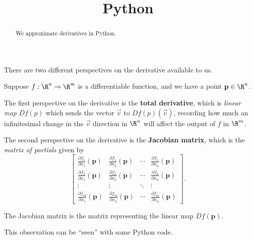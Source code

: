 \documentclass{ximera}
\title{Python}
\begin{document}
\begin{abstract}
  We approximate derivatives in Python.
\end{abstract}

There are two different perspectives on the derivative available to us.

Suppose $f : \R^n \to \R^m$ is a differentiable function, and we have
a point $\mathbf{p} \in \R^n$.

The first perspective on the derivative is the \textbf{total
  derivative}, which is \textit{linear map} $Df(p)$ which sends the
vector $\vec{v}$ to $Df(p)(\vec{v})$, recording how much an
infinitesimal change in the $\vec{v}$ direction in $\R^n$ will affect
the output of $f$ in $\R^m$.

The second perspective on the derivative is the \textbf{Jacobian
  matrix}, which is the \textit{matrix of partials} given by
$$
\begin{bmatrix}
  \frac{\partial f_1}{\partial x_1} \left(\mathbf{p}\right) & \frac{\partial f_1}{\partial x_2} \left(\mathbf{p}\right) & \cdots & \frac{\partial f_1}{\partial x_n}\left(\mathbf{p}\right) \\
  \frac{\partial f_2}{\partial x_1} \left(\mathbf{p}\right) & \frac{\partial f_2}{\partial x_2} \left(\mathbf{p}\right) & \cdots & \frac{\partial f_2}{\partial x_n}\left(\mathbf{p}\right) \\
  \vdots                                                    & \vdots                                                    & \ddots & \vdots \\
  \frac{\partial f_m}{\partial x_1} \left(\mathbf{p}\right) & \frac{\partial f_m}{\partial x_2} \left(\mathbf{p}\right) & \cdots & \frac{\partial f_m}{\partial x_n}\left(\mathbf{p}\right) 
\end{bmatrix}.
$$

\begin{observation}
  The Jacobian matrix is the matrix representing the linear map $Df(\mathbf{p})$.
\end{observation}

This observation can be ``seen'' with some Python code.
\end{document}
